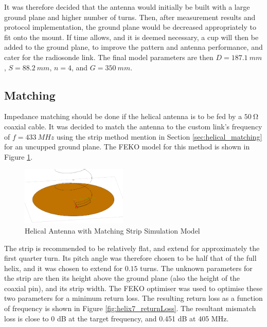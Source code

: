 It was therefore decided that the antenna would initially be built with a large ground plane and higher number of turns. Then, after measurement results and protocol implementation, the ground plane would be decreased appropriately to fit onto the mount. If time allows, and it is deemed necessary, a cup will then be added to the ground plane, to improve the pattern and antenna performance, and cater for the radiosonde link. The final model parameters are then $D = \SI{187.1}{mm}$, $S = \SI{88.2}{mm}$, $n = 4$, and $G = \SI{350}{mm}$.

\subsection{Matching}
Impedance matching should be done if the helical antenna is to be fed by a $\SI{50}{\ohm}$ coaxial cable. It was decided to match the antenna to the custom link's frequency of $f = \SI{433}{MHz}$ using the strip method mention in Section \ref{sec:helical_matching} for an uncupped ground plane. The FEKO model for this method is shown in Figure \ref{fig:helix7_model}.

\begin{figure}[!htb]
  \centering
  \includegraphics[width=0.45\textwidth]{helix7_model}
  \caption{Helical Antenna with Matching Strip Simulation Model}
  \label{fig:helix7_model}
\end{figure}

The strip is recommended to be relatively flat, and extend for approximately the first quarter turn. Its pitch angle was therefore chosen to be half that of the full helix, and it was chosen to extend for $0.15$ turns. The unknown parameters for the strip are then its height above the ground plane (also the height of the coaxial pin), and its strip width. The FEKO optimiser was used to optimise these two parameters for a minimum return loss. The resulting return loss as a function of frequency is shown in Figure \ref{fig:helix7_returnLoss}. The resultant mismatch loss is close to 0 dB at the target frequency, and 0.451 dB at 405 MHz.

